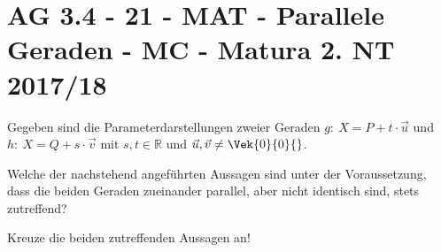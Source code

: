 \section{AG 3.4 - 21 - MAT - Parallele Geraden - MC - Matura 2. NT 2017/18}

\begin{beispiel}[AG 3.4]{1}
Gegeben sind die Parameterdarstellungen zweier Geraden $g\!:~ X=P+t\cdot \vec{u}$ und $h\!:~X=Q+s\cdot \vec{v}$ mit $s, t \in \mathbb{R}$ und $\vec{u}, \vec{v}\neq \Vek{0}{0}{}$.

Welche der nachstehend angeführten Aussagen sind unter der Voraussetzung, dass die beiden Geraden zueinander parallel, aber nicht identisch sind, stets zutreffend?

Kreuze die beiden zutreffenden Aussagen an!

\end{beispiel}
